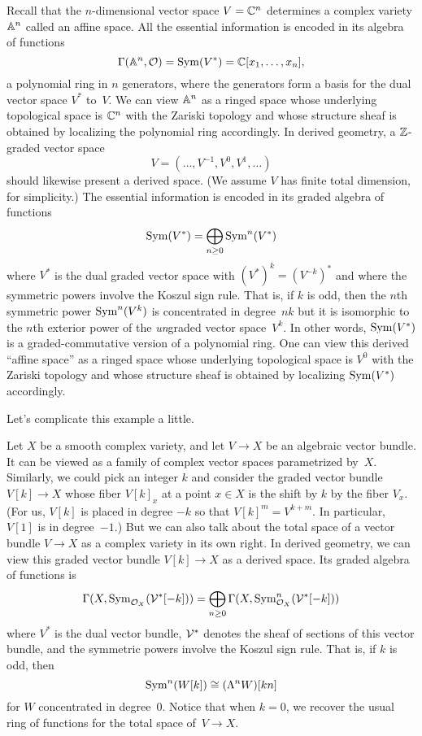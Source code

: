\documentclass[11pt]{amsart}
\begin{document}
Recall that the $n$-dimensional vector space $V = \CC^n$ determines a complex variety $\AA^n$ called an affine space.
All the essential information is encoded in its algebra of functions
\[
\Gamma(\AA^n, \cO) = \Sym(V^*) = \CC[x_1,\ldots, x_n],
\]
a polynomial ring in $n$ generators, where the generators form a basis for the dual vector space $V^*$ to~$V$.
We can view $\AA^n$ as a ringed space whose underlying topological space is $\CC^n$ with the Zariski topology
and whose structure sheaf is obtained by localizing the polynomial ring accordingly.
In derived geometry, a $\ZZ$-graded vector space 
\[
V = ( \ldots, V^{-1}, V^0, V^1, \ldots)
\]
should likewise present a derived space.
(We assume $V$ has finite total dimension, for simplicity.) 
The essential information is encoded in its graded algebra of functions
\[
\Sym(V^*) = \bigoplus_{n \geq 0} \Sym^n(V^*)
\]
where $V^*$ is the dual graded vector space with $(V^*)^k = (V^{-k})^*$ and where the symmetric powers involve the Koszul sign rule.
That is, if $k$ is odd, then the $n$th symmetric power $\Sym^n(V^k)$ is concentrated in degree~$nk$ 
but it is isomorphic to the $n$th exterior power of the {\em un}\/graded vector space~$V^k$.
In other words, $\Sym(V^*)$ is a graded-commutative version of a polynomial ring.
One can view this derived ``affine space'' as a ringed space whose underlying topological space is $V^0$ with the Zariski topology 
and whose structure sheaf is obtained by localizing $\Sym(V^*)$ accordingly.

Let's complicate this example a little.

Let $X$ be a smooth complex variety, and let $V \to X$ be an algebraic vector bundle.
It can be viewed as a family of complex vector spaces parametrized by~$X$.
Similarly, we could pick an integer $k$ and consider the graded vector bundle $V[k] \to X$ whose fiber $V[k]_x$ at a point $x \in X$ is the shift by $k$ by the fiber $V_x$.
(For us, $V[k]$ is placed in degree $-k$ so that $V[k]^m = V^{k+m}$. 
In particular, $V[1]$ is in degree~$-1$.)
But we can also talk about the total space of a vector bundle $V \to X$ as a complex variety in its own right.
In derived geometry, we can view this graded vector bundle $V[k] \to X$ as a derived space.
Its graded algebra of functions is 
\[
\Gamma(X,\Sym_{\cO_X}(\cV^*[-k])) = \bigoplus_{n \geq 0} \Gamma(X, \Sym^n_{\cO_X}(\cV^*[-k]))
\] 
where $V^*$ is the dual vector bundle, $\cV^*$ denotes the sheaf of sections of this vector bundle, and the symmetric powers involve the Koszul sign rule.
That is, if $k$ is odd, then 
\[
\Sym^n(W[k]) \cong (\Lambda^n W)[kn]
\]
for $W$ concentrated in degree~0.
Notice that when $k = 0$, we recover the usual ring of functions for the total space of~$V \to X$.
\end{document}
